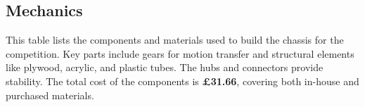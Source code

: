 \documentclass{article}
\begin{document}
\begin{adjustbox}{valign=t,minipage={0.47\textwidth}}
	\subsection{Mechanics}\large
	This table lists the components and materials used to build the chassis for the competition. Key parts include gears for motion transfer and structural elements like plywood, acrylic, and plastic tubes. The hubs and connectors provide stability. The total cost of the components is \textbf{\pounds31.66}, covering both in-house and purchased materials.
\end{adjustbox}\\

\vspace*{\fill}
\end{document}
